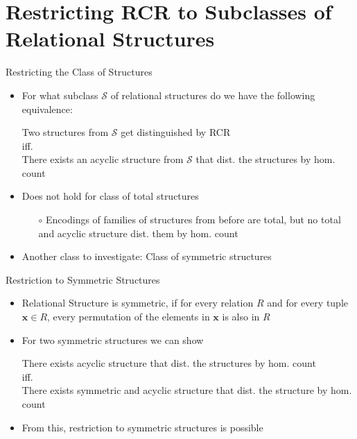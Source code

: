 \documentclass[aspectratio=169]{beamer}
\begin{document}
	\section{Restricting RCR to Subclasses of Relational Structures}
	
	\begin{frame}{Restricting the Class of Structures}
		\begin{itemize}
			\item For what subclass $\mathcal S$ of relational structures do we have the following equivalence:
			\begin{center}
				Two structures from $\mathcal S$ get distinguished by RCR\\
				iff.\\
				There exists an acyclic structure from $\mathcal S$ that dist. the structures by hom. count
			\end{center}
			\item Does not hold for class of total structures
			\begin{itemize}
				\item[$\circ$] Encodings of families of structures from before are total, but no total and acyclic structure dist. them by hom. count
			\end{itemize}
			\item Another class to investigate: Class of symmetric structures
		\end{itemize}
	\end{frame}
	
	\begin{frame}{Restriction to Symmetric Structures}
		\begin{itemize}
			\item Relational Structure is symmetric, if for every relation $R$ and for every tuple $\mathbf x\in R$, every permutation of the elements in $\mathbf x$ is also in $R$
			\pause
			\item For two symmetric structures we can show
			\begin{center}
				There exists acyclic structure that dist. the structures by hom. count\\
				iff.\\
				There exists symmetric and acyclic structure that dist. the structure by hom. count
			\end{center}
			\item From this, restriction to symmetric structures is possible
		\end{itemize}
	\end{frame}
	
\end{document}
